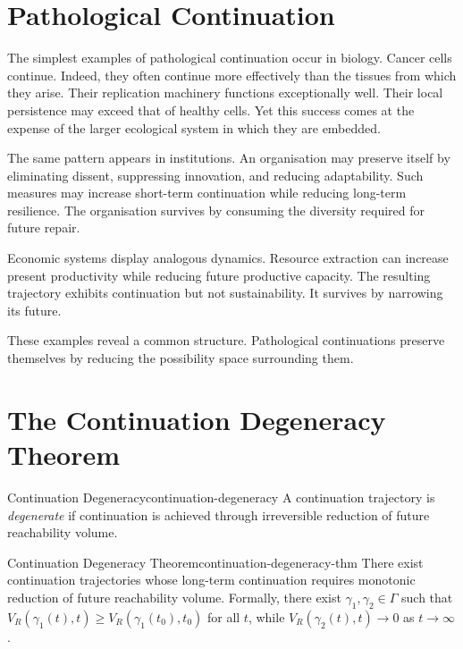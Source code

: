 \documentclass[12pt,twoside,openright]{book}
\begin{document}
\section{Pathological Continuation}
\label{sec:ch10-pathological}

The simplest examples of pathological continuation occur in
biology. Cancer cells continue. Indeed, they often continue
more effectively than the tissues from which they arise.
Their replication machinery functions exceptionally well.
Their local persistence may exceed that of healthy cells.
Yet this success comes at the expense of the larger
ecological system in which they are embedded.

The same pattern appears in institutions. An organisation
may preserve itself by eliminating dissent, suppressing
innovation, and reducing adaptability. Such measures may
increase short-term continuation while reducing long-term
resilience. The organisation survives by consuming the
diversity required for future repair.

Economic systems display analogous dynamics. Resource
extraction can increase present productivity while reducing
future productive capacity. The resulting trajectory
exhibits continuation but not sustainability. It survives
by narrowing its future.

These examples reveal a common structure. Pathological
continuations preserve themselves by reducing the
possibility space surrounding them.

\section{The Continuation Degeneracy Theorem}
\label{sec:ch10-degeneracy}

\begin{definition}{Continuation Degeneracy}{continuation-degeneracy}
  A continuation trajectory is \emph{degenerate} if
  continuation is achieved through irreversible reduction
  of future reachability volume.
\end{definition}

\begin{theorem}{Continuation Degeneracy Theorem}{continuation-degeneracy-thm}
  There exist continuation trajectories whose long-term
  continuation requires monotonic reduction of future
  reachability volume. Formally, there exist
  $\gamma_1,\gamma_2\in\Gamma$ such that
  $V_R(\gamma_1(t),t)\ge V_R(\gamma_1(t_0),t_0)$ for all
  $t$, while $V_R(\gamma_2(t),t)\to0$ as $t\to\infty$.
\end{theorem}
\end{document}
